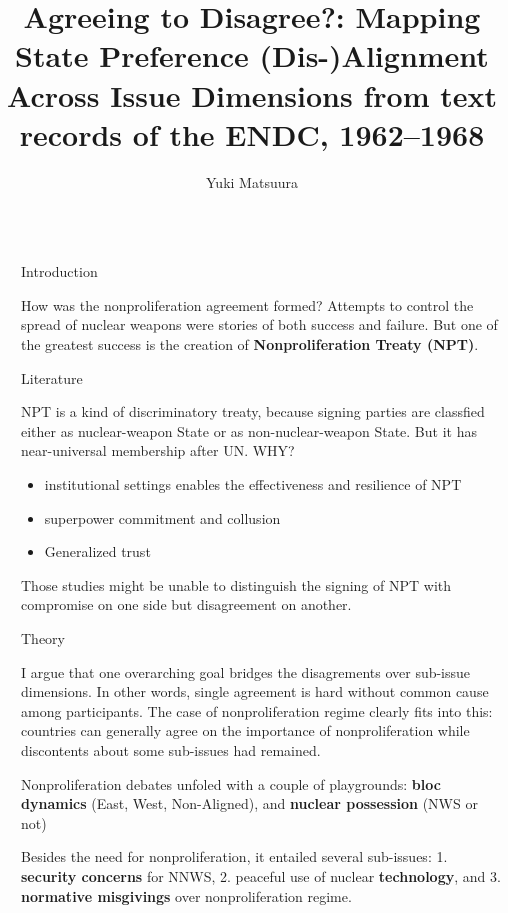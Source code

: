 \documentclass[final]{beamer}
\title{Agreeing to Disagree?: Mapping State Preference (Dis-)Alignment Across Issue Dimensions from text records of the ENDC, 1962–1968}
\author{Yuki Matsuura \inst{1}}
\institute[shortinst]{\inst{1} IDE-JETRO}
\newlength{\sepwidth}
\newlength{\colwidth}
\newcommand{\separatorcolumn}{\begin{column}{\sepwidth}\end{column}}
\begin{document}
\begin{frame}[t]
\begin{columns}[t]
\separatorcolumn

\begin{column}{\colwidth}

  \begin{block}{Introduction}

    How was the nonproliferation agreement formed? Attempts to control the spread of nuclear weapons were stories of both success and failure. But one of the greatest success is the creation of \textbf{Nonproliferation Treaty (NPT)}. 

  \end{block}

  \begin{block}{Literature}
    
    NPT is a kind of discriminatory treaty, because signing parties are classfied either as nuclear-weapon State or as non-nuclear-weapon State. But it has near-universal membership after UN. WHY?

    \begin{itemize}
      \item institutional settings enables the effectiveness and resilience of NPT
      \item superpower commitment and collusion
      \item Generalized trust
    \end{itemize}

    Those studies might be unable to distinguish the signing of NPT with compromise on one side but disagreement on another.

  \end{block}

  \begin{block}{Theory}
    
    I argue that one overarching goal bridges the disagrements over sub-issue dimensions. In other words, single agreement is hard without common cause among participants. The case of nonproliferation regime clearly fits into this: countries can generally agree on the importance of nonproliferation while discontents about some sub-issues had remained. 

    Nonproliferation debates unfoled with a couple of playgrounds: \textbf{bloc dynamics} (East, West, Non-Aligned), and \textbf{nuclear possession} (NWS or not)

    Besides the need for nonproliferation, it entailed several sub-issues: 1. \textbf{security concerns} for NNWS, 2. peaceful use of nuclear \textbf{technology}, and 3. \textbf{normative misgivings} over nonproliferation regime. 


\end{block}
\end{column}
\end{columns}
\end{frame}
\end{document}
